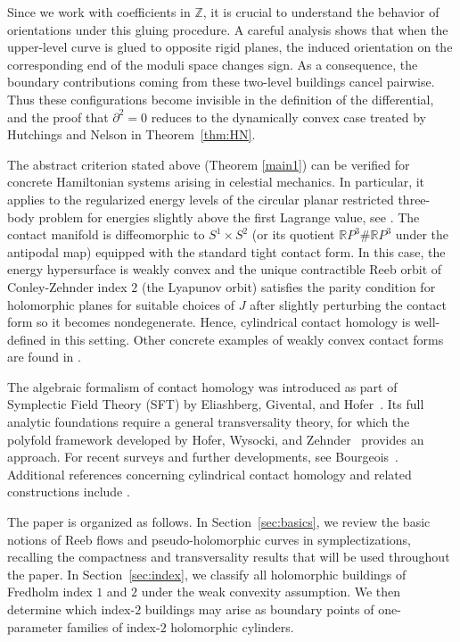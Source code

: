 \documentclass{amsart}
\newcommand{\R}{\mathbb{R}}
\begin{document}
Since we work with coefficients in $\mathbb{Z}$, it is crucial to
understand the behavior of orientations under this gluing procedure.
A careful analysis shows that when the upper-level curve is glued to
opposite rigid planes, the induced orientation on the corresponding
end of the moduli space changes sign. As a consequence, the boundary
contributions coming from these two-level buildings cancel pairwise.
Thus these configurations become invisible in the definition of the
differential, and the proof that $\partial^2=0$ reduces to the
dynamically convex case treated by Hutchings and Nelson in
Theorem~\ref{thm:HN}.



The abstract criterion stated above (Theorem \ref{main1}) can be verified
for concrete Hamiltonian systems arising in celestial mechanics.
In particular, it applies to the regularized energy levels of the
circular planar restricted three-body problem for energies slightly above
the first Lagrange value, see \cite{LS}. The contact manifold is diffeomorphic to $S^1 \times S^2$ (or its quotient $\R P^3 \# \R P^3$ under the antipodal map) equipped with the standard tight contact form. 
In this case, the energy hypersurface is weakly convex and the unique  contractible
Reeb orbit of Conley-Zehnder index $2$ (the Lyapunov orbit) satisfies the parity condition
for holomorphic planes for suitable choices of $J$ after slightly perturbing the contact form so it becomes nondegenerate. Hence, cylindrical contact homology is
well-defined in this setting. Other concrete examples of weakly convex contact forms are found in \cite{ dePauloHryniewiczKimSalomao2024, dPSS,dePauloSalomao2019}.




The algebraic formalism of contact homology was introduced as part of Symplectic Field Theory (SFT) by Eliashberg, Givental, and Hofer~\cite{EGH00}. 
Its full analytic foundations require a general transversality theory, for which the polyfold framework developed by Hofer, Wysocki, and Zehnder~\cite{HWZ_polyfold} provides an approach. For recent surveys and further developments, see Bourgeois~\cite{Bourgeois2025}. 
Additional references concerning cylindrical contact homology and related constructions include 
\cite{EGH00, yau2004, vK08, yau2009, Momin, AM12, N, HM, Golovko, BH18, HMark, Digiosia, HMS}.




The paper is organized as follows. In Section~\ref{sec:basics}, we review
the basic notions of Reeb flows and pseudo-holomorphic curves in
symplectizations, recalling the compactness and
transversality results that will be used throughout the paper.
In Section~\ref{sec:index}, we classify all holomorphic buildings of
Fredholm index $1$ and $2$ under the weak convexity assumption.
We then determine which index-$2$ buildings may arise as boundary
points of one-parameter families of index-$2$ holomorphic cylinders.
\end{document}
